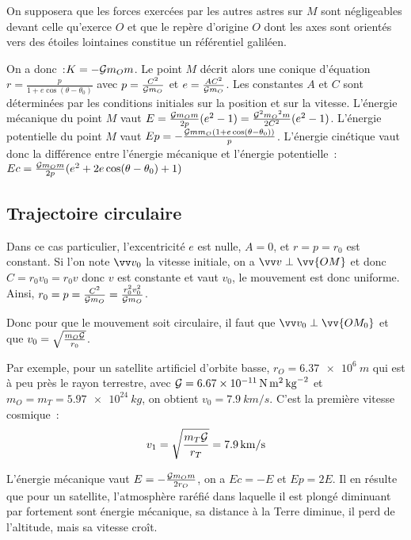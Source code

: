 On supposera que les forces exercées par les autres astres sur \(M\) sont 
négligeables devant celle qu'exerce \(O\) et que le repère d'origine \(O\) dont 
les axes sont orientés vers des étoiles lointaines constitue un référentiel
galiléen.

On a donc~:\(K = -\mathcal{G} m_O m\). Le point \(M\) décrit alors une conique 
d'équation \(r = \frac{p}{1+e\cos(\theta - \theta_0)}\) avec \(p = 
\frac{C^2}{\mathcal{G} m_O}\) et \(e = \frac{AC^2}{\mathcal{G} m_O}\). Les constantes \(A\) et%
\(C\) sont déterminées par les conditions initiales sur la position et sur la 
vitesse. L'énergie mécanique du point \(M\) vaut \(E = \frac{\mathcal{G} m_O 
m}{2p}(e^2-1) = \frac{\mathcal{G}^2{m_O}^2m}{2C^2}(e^2-1)\). L'énergie potentielle du 
point \(M\) vaut \(Ep = -\frac{\mathcal{G} m m_O (1+e\cos(\theta-\theta_0))}{p}\). 
L'énergie cinétique vaut donc la différence entre l'énergie mécanique et 
l'énergie potentielle~: \(Ec = \frac{\mathcal{G} m_O m}{2p}(e^2 + 
2e\cos(\theta-\theta_0)+1)\)

\subsection{Trajectoire circulaire}%
Dans ce cas particulier, l'excentricité \(e\) est nulle, \(A=0\), et 
\(r=p=r_0\) est constant. Si l'on note \(\vvv_0\) la vitesse initiale, on a 
\(\vvv \perp \vv{OM}\)
et donc \(C = r_0 v_0 = r_0 v\) donc \(v\) est constante et vaut \(v_0\), le 
mouvement est donc uniforme.
Ainsi, \(r_0 = p = \frac{C^2}{\mathcal{G} m_O} = \frac{r_0^2v_0^2}{\mathcal{G} m_O}\).

Donc pour que le mouvement soit circulaire, il faut que \(\vvv_0 \perp 
\vv{OM_0}\) et que \(v_0 = \sqrt{\frac{m_O \mathcal{G}}{r_0}}\).%

Par exemple, pour un satellite artificiel d'orbite basse, \(r_O = 
\qty{6.37e6}{m}\) qui est à peu près le rayon terrestre, avec \(\Gb = %
\qty{6.67e{-11}}{N.m^2.kg^{-2}}\) et \(m_O=m_T=\qty{5.97e24}{kg}\), on obtient 
%
\(v_0 = \qty{7.9}{km/s}\). C'est la première vitesse cosmique~:
\begin{equation}%
  v_1 = \sqrt{\frac{m_T \Gb}{r_T}} = \qty{7.9}{km/s}
\end{equation}%

L'énergie mécanique vaut \(E = -\frac{\mathcal{G} m_O m}{2r_O}\), on a \(Ec=-E\) et 
\(Ep = 2E\). Il en résulte que pour un satellite, l'atmosphère raréfié dans 
laquelle il est plongé diminuant par fortement sont énergie mécanique, sa 
distance à la Terre diminue, il perd de l'altitude, mais sa vitesse croît.

